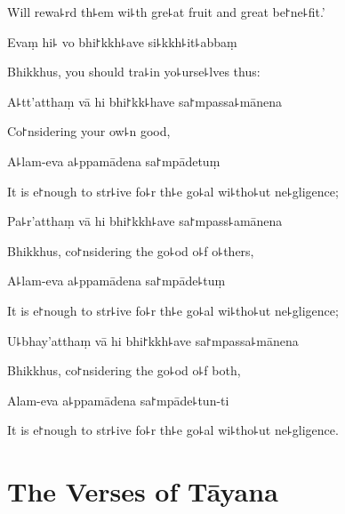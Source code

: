 \begin{english}
  Will rewa꜕rd th꜕em wi꜕th gre꜕at fruit and great be꜓ne꜕fit.'
\end{english}

Evaṃ hi꜕ vo bhi꜓kkh꜕ave si꜕kkh꜕it꜕abbaṃ

\begin{english}
  Bhikkhus, you should tra꜕in yo꜕urse꜕lves thus:
\end{english}

A꜕tt'atthaṃ vā hi bhi꜓kk꜕have sa꜓mpassa꜕mānena

\begin{english}
  Co꜓nsidering your ow꜕n good,
\end{english}

A꜕lam-eva a꜕ppamādena sa꜓mpādetuṃ

\begin{english}
  It is e꜓nough to str꜕ive fo꜕r th꜕e go꜕al wi꜕tho꜕ut ne꜕gligence;
\end{english}

Pa꜕r'atthaṃ vā hi bhi꜓kkh꜕ave sa꜓mpass꜕amānena

\begin{english}
  Bhikkhus, co꜓nsidering the go꜕od o꜕f o꜕thers,
\end{english}

A꜕lam-eva a꜕ppamādena sa꜓mpāde꜕tuṃ

\begin{english}
  It is e꜓nough to str꜕ive fo꜕r th꜕e go꜕al wi꜕tho꜕ut ne꜕gligence;
\end{english}

U꜕bhay'atthaṃ vā hi bhi꜓kkh꜕ave sa꜓mpassa꜕mānena

\begin{english}
  Bhikkhus, co꜓nsidering the go꜕od o꜕f both,
\end{english}

Alam-eva a꜕ppamādena sa꜓mpāde꜕tun-ti

\begin{english}
  It is e꜓nough to str꜕ive fo꜕r th꜕e go꜕al wi꜕tho꜕ut ne꜕gligence.
\end{english}

\chapter{The Verses of Tāyana}%


\begin{leader}
\end{leader}

